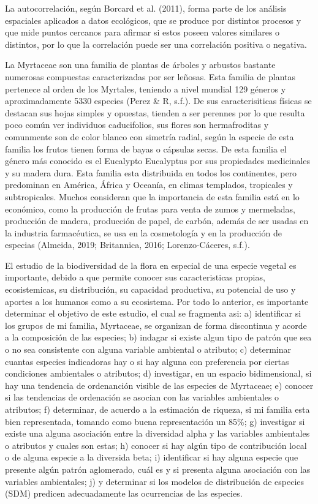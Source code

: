 \documentclass[11pt,]{article}
\begin{document}
La autocorrelación, según Borcard et al. (2011), forma parte de los
análisis espaciales aplicados a datos ecológicos, que se produce por
distintos procesos y que mide puntos cercanos para afirmar si estos
poseen valores similares o distintos, por lo que la correlación puede
ser una correlación positiva o negativa.

La Myrtaceae son una familia de plantas de árboles y arbustos bastante
numerosas compuestas caracterizadas por ser leñosas. Esta familia de
plantas pertenece al orden de los Myrtales, teniendo a nivel mundial 129
géneros y aproximadamente 5330 especies (Perez \& R, s.f.). De sus
caracterisiticas físicas se destacan sus hojas simples y opuestas,
tienden a ser perennes por lo que resulta poco común ver individuos
caducifolios, sus flores son hermafroditas y comunmente son de color
blanco con simetría radial, según la especie de esta familia los frutos
tienen forma de bayas o cápsulas secas. De esta familia el género más
conocido es el Eucalypto Eucalyptus por sus propiedades medicinales y su
madera dura. Esta familia esta distribuida en todos los continentes,
pero predominan en América, África y Oceanía, en climas templados,
tropicales y subtropicales. Muchos consideran que la importancia de esta
familia está en lo económico, como la producción de frutas para venta de
zumos y mermeladas, producción de madera, producción de papel, de
carbón, además de ser usadas en la industria farmacéutica, se usa en la
cosmetología y en la producción de especias (Almeida, 2019; Britannica,
2016; Lorenzo-Cáceres, s.f.).

El estudio de la biodiversidad de la flora en especial de una especie
vegetal es importante, debido a que permite conocer sus caracteristicas
propias, ecosistemicas, su distribución, su capacidad productiva, su
potencial de uso y aportes a los humanos como a su ecosistema. Por todo
lo anterior, es importante determinar el objetivo de este estudio, el
cual se fragmenta asi: a) identificar si los grupos de mi familia,
Myrtaceae, se organizan de forma discontinua y acorde a la composición
de las especies; b) indagar si existe algun tipo de patrón que sea o no
sea consistente con alguna variable ambiental o atributo; c) determinar
cuantas especies indicadoras hay o si hay alguna con preferencia por
ciertas condiciones ambientales o atributos; d) investigar, en un
espacio bidimensional, si hay una tendencia de ordenanción visible de
las especies de Myrtaceae; e) conocer si las tendencias de ordenación se
asocian con las variables ambientales o atributos; f) determinar, de
acuerdo a la estimación de riqueza, si mi familia esta bien
representada, tomando como buena representación un 85\%; g) investigar
si existe una alguna asociación entre la diversidad alpha y las
variables ambientales o atributos y cuales son estas; h) conocer si hay
algún tipo de contribución local o de alguna especie a la diversida
beta; i) identificar si hay alguna especie que presente algún patrón
aglomerado, cuál es y si presenta alguna asociación con las variables
ambientales; j) y determinar si los modelos de distribución de especies
(SDM) predicen adecuadamente las ocurrencias de las especies.
\end{document}
